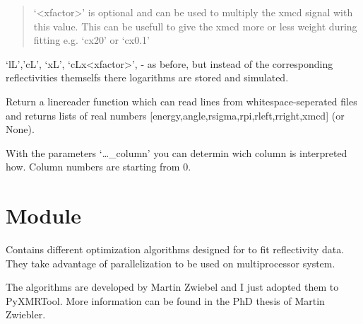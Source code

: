 \documentclass[letterpaper,10pt,english]{sphinxmanual}
\begin{document}
\begin{fulllineitems}
\begin{fulllineitems}
\begin{description}
\begin{quote}
‘\textless{}xfactor\textgreater{}’ is optional and can be used to multiply the xmcd signal with this value. This can be usefull to give the xmcd more or less weight during fitting
e.g.   ‘cx20’ or ‘cx0.1’
\end{quote}

‘lL’,’cL’,
‘xL’,
‘cLx\textless{}xfactor\textgreater{}’, - as before, but instead of the corresponding reflectivities themselfs there logarithms are stored and simulated.

\end{description}

\end{fulllineitems}


\begin{fulllineitems}
\label{\detokenize{modules-api/experiment:Experiment.ReflDataSimulator.createLinereader}}
Return a linereader function which can read lines from whitespace-seperated files and returns lists of real numbers {[}energy,angle,rsigma,rpi,rleft,rright,xmcd{]} (or None).

With the parameters ‘…\_column’ you can determin wich column is interpreted how.
Column numbers are starting from 0.

\end{fulllineitems}


\end{fulllineitems}



\section{Module }
\label{\detokenize{modules-api/fitters:module-Fitters}}\label{\detokenize{modules-api/fitters:module-fitters}}\label{\detokenize{modules-api/fitters::doc}}
Contains different optimization algorithms designed for to fit reflectivity data.
They take advantage of parallelization to be used on multiprocessor system.

The algorithms are developed by Martin Zwiebel and I just adopted them to PyXMRTool.
More information can be found in the PhD thesis of Martin Zwiebler.
\end{document}

